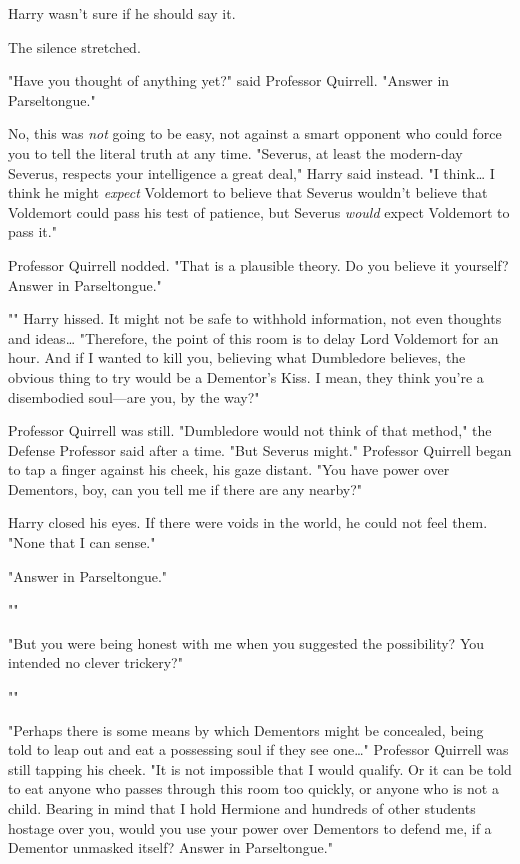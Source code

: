 Harry wasn't sure if he should say it.

The silence stretched.

"Have you thought of anything yet?" said Professor Quirrell. "Answer in 
Parseltongue."

No, this was \emph{not} going to be easy, not against a smart opponent who 
could force you to tell the literal truth at any time. "Severus, at least the 
modern-day Severus, respects your intelligence a great deal," Harry said 
instead. "I think{\ldots} I think he might \emph{expect} Voldemort to believe 
that Severus wouldn't believe that Voldemort could pass his test of patience, 
but Severus \emph{would} expect Voldemort to pass it."

Professor Quirrell nodded. "That is a plausible theory. Do you believe it 
yourself? Answer in Parseltongue."

"" Harry hissed. It might not be safe to withhold information, not 
even thoughts and ideas{\ldots} "Therefore, the point of this room is to delay 
Lord Voldemort for an hour. And if I wanted to kill you, believing what 
Dumbledore believes, the obvious thing to try would be a Dementor's Kiss. I 
mean, they think you're a disembodied soul---are you, by the way?"

Professor Quirrell was still. "Dumbledore would not think of that method," the 
Defense Professor said after a time. "But Severus might." Professor Quirrell 
began to tap a finger against his cheek, his gaze distant. "You have power over 
Dementors, boy, can you tell me if there are any nearby?"

Harry closed his eyes. If there were voids in the world, he could not feel 
them. "None that I can sense."

"Answer in Parseltongue."

""

"But you were being honest with me when you suggested the possibility? You 
intended no clever trickery?"

""

"Perhaps there is some means by which Dementors might be concealed, being told 
to leap out and eat a possessing soul if they see one{\ldots}" Professor 
Quirrell was still tapping his cheek. "It is not impossible that I would 
qualify. Or it can be told to eat anyone who passes through this room too 
quickly, or anyone who is not a child. Bearing in mind that I hold Hermione and 
hundreds of other students hostage over you, would you use your power over 
Dementors to defend me, if a Dementor unmasked itself? Answer in Parseltongue."

